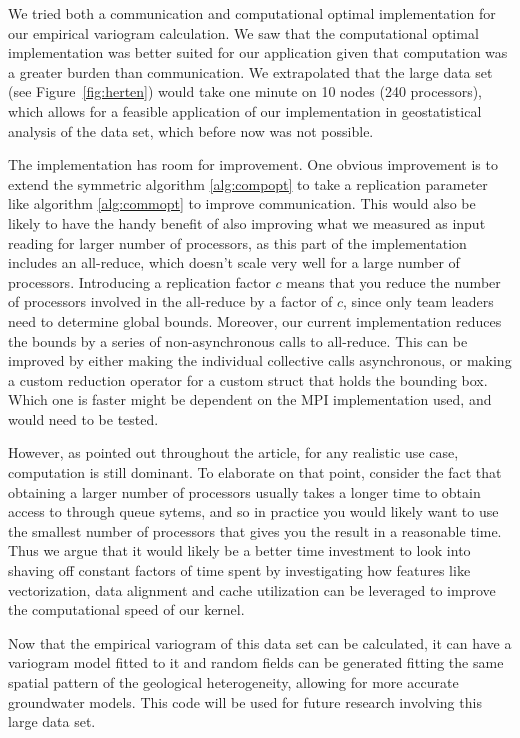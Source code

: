 
We tried both a communication and computational optimal implementation for our empirical variogram calculation. We saw that the computational optimal implementation was better suited for our application given that computation was a greater burden than communication. We extrapolated that the large data set (see Figure~\ref{fig:herten}) would take one minute on 10 nodes (240 processors), which allows for a feasible application of our implementation in geostatistical analysis of the data set, which before now was not possible.

The implementation has room for improvement. One obvious improvement is to extend the symmetric algorithm \ref{alg:compopt} to take a replication parameter like algorithm \ref{alg:commopt} to improve communication. This would also be likely to have the handy benefit of also improving what we measured as input reading for larger number of processors, as this part of the implementation includes an all-reduce, which doesn't scale very well for a large number of processors. Introducing a replication factor $c$ means that you reduce the number of processors involved in the all-reduce by a factor of $c$, since only team leaders need to determine global bounds. Moreover, our current implementation reduces the bounds by a series of non-asynchronous calls to all-reduce. This can be improved by either making the individual collective calls asynchronous, or making a custom reduction operator for a custom struct that holds the bounding box. Which one is faster might be dependent on the MPI implementation used, and would need to be tested.

However, as pointed out throughout the article, for any realistic use case, computation is still dominant. To elaborate on that point, consider the fact that obtaining a larger number of processors usually takes a longer time to obtain access to through queue sytems, and so in practice you would likely want to use the smallest number of processors that gives you the result in a reasonable time. Thus we argue that it would likely be a better time investment to look into shaving off constant factors of time spent by investigating how features like vectorization, data alignment and cache utilization can be leveraged to improve the computational speed of our kernel.

Now that the empirical variogram of this data set can be calculated, it can have a variogram model fitted to it and random fields can be generated fitting the same spatial pattern of the geological heterogeneity, allowing for more accurate groundwater models. This code will be used for future research involving this large data set. 

